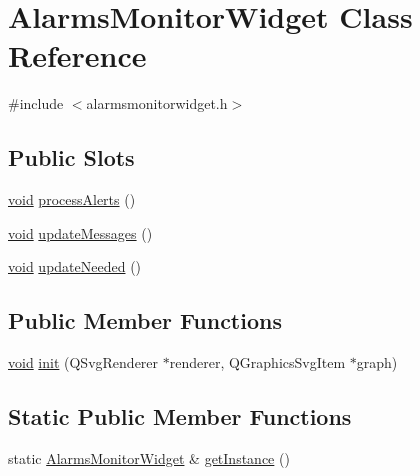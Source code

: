 \hypertarget{class_alarms_monitor_widget}{\section{\-Alarms\-Monitor\-Widget \-Class \-Reference}
\label{class_alarms_monitor_widget}
}


{\ttfamily \#include $<$alarmsmonitorwidget.\-h$>$}

\subsection*{\-Public \-Slots}
\begin{DoxyCompactItemize}
\item 
\hyperlink{group___u_a_v_objects_plugin_ga444cf2ff3f0ecbe028adce838d373f5c}{void} \hyperlink{group___core_plugin_ga8618886c20a264458193f109665ee641}{process\-Alerts} ()
\item 
\hyperlink{group___u_a_v_objects_plugin_ga444cf2ff3f0ecbe028adce838d373f5c}{void} \hyperlink{group___core_plugin_ga898e37685ca3daea962f390013dd9aed}{update\-Messages} ()
\item 
\hyperlink{group___u_a_v_objects_plugin_ga444cf2ff3f0ecbe028adce838d373f5c}{void} \hyperlink{group___core_plugin_ga1a22860e7935d58f9b621150bb2f5322}{update\-Needed} ()
\end{DoxyCompactItemize}
\subsection*{\-Public \-Member \-Functions}
\begin{DoxyCompactItemize}
\item 
\hyperlink{group___u_a_v_objects_plugin_ga444cf2ff3f0ecbe028adce838d373f5c}{void} \hyperlink{group___core_plugin_ga1e4449a52ae8ec79153006b4cc59248a}{init} (\-Q\-Svg\-Renderer $\ast$renderer, \-Q\-Graphics\-Svg\-Item $\ast$graph)
\end{DoxyCompactItemize}
\subsection*{\-Static \-Public \-Member \-Functions}
\begin{DoxyCompactItemize}
\item 
static \hyperlink{class_alarms_monitor_widget}{\-Alarms\-Monitor\-Widget} \& \hyperlink{group___core_plugin_ga11f85ea4e04628c4502bdb943eff5e2e}{get\-Instance} ()
\end{DoxyCompactItemize}


